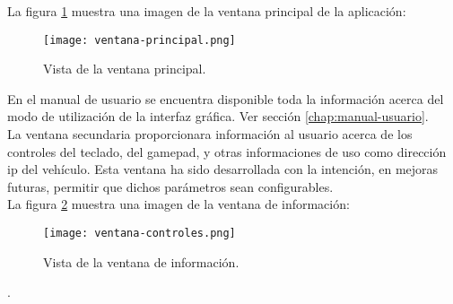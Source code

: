 La figura \ref{fig:ventana-principal} muestra una imagen de la ventana principal de la aplicación:\\

\begin{figure}[H]
  \begin{center}
    \texttt{[image: ventana-principal.png]}
  \end{center}
  \caption{Vista de la ventana principal.}
  \label{fig:ventana-principal}
\end{figure}

En el manual de usuario se encuentra disponible toda la información acerca del modo de utilización de la interfaz gráfica. Ver sección \ref{chap:manual-usuario}.\\

La ventana secundaria proporcionara información al usuario acerca de los controles del teclado, del gamepad, y otras informaciones de uso como dirección ip del vehículo. Esta ventana ha sido desarrollada con la intención, en mejoras futuras, permitir que dichos parámetros sean configurables.\\

La figura \ref{fig:ventana-información} muestra una imagen de la ventana de información:

\begin{figure}[H]
  \begin{center}
    \texttt{[image: ventana-controles.png]}
  \end{center}
  \caption{Vista de la ventana de información.}
  \label{fig:ventana-información}
\end{figure}.









